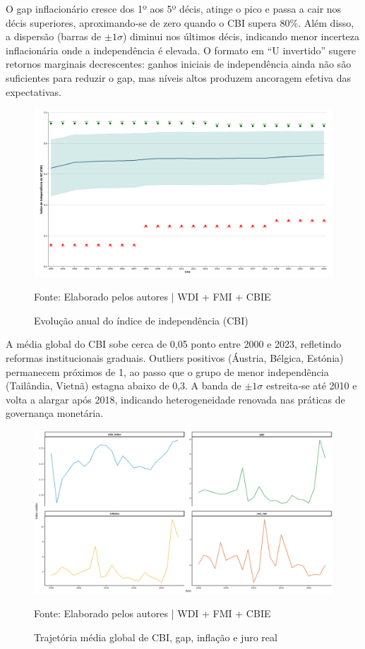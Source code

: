 \documentclass[a4paper,12pt]{article}
\begin{document}
O gap inflacionário cresce dos 1º aos 5º décis, atinge o pico e passa a cair nos décis superiores, aproximando‑se de zero quando o CBI supera 80\%.  
Além disso, a dispersão (barras de \(\pm1\sigma\)) diminui nos últimos décis, indicando menor incerteza inflacionária onde a independência é elevada.  
O formato em “U invertido” sugere retornos marginais decrescentes: ganhos iniciais de independência ainda não são suficientes para reduzir o gap, mas níveis altos produzem ancoragem efetiva das expectativas.

\begin{figure}[H]
    \centering
    \caption{Evolução anual do índice de independência (CBI)}
    \includegraphics[width=.85\linewidth]{Imagens/paperi8.png}
    \label{fig:cbi_trend}

    \footnotesize{Fonte: Elaborado pelos autores | WDI + FMI + CBIE}
\end{figure}

A média global do CBI sobe cerca de 0,05 ponto entre 2000 e 2023, refletindo reformas institucionais graduais.  
Outliers positivos (Áustria, Bélgica, Estónia) permanecem próximos de 1, ao passo que o grupo de menor independência (Tailândia, Vietnã) estagna abaixo de 0,3.  
A banda de \(\pm1\sigma\) estreita‑se até 2010 e volta a alargar após 2018, indicando heterogeneidade renovada nas práticas de governança monetária.

\begin{figure}[H]
    \centering
    \caption{Trajetória média global de CBI, gap, inflação e juro real}
    \includegraphics[width=.85\linewidth]{Imagens/paperi9.png}
    \label{fig:series_painel}

    \footnotesize{Fonte: Elaborado pelos autores | WDI + FMI + CBIE}
\end{figure}
\end{document}
